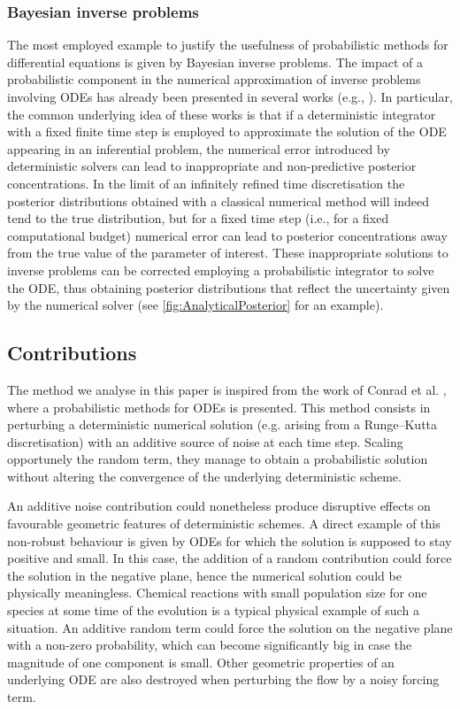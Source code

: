 \documentclass[10pt]{article}
\begin{document}
\subsubsection*{Bayesian inverse problems} The most employed example to justify the usefulness of probabilistic methods for differential equations is given by Bayesian inverse problems. The impact of a probabilistic component in the numerical approximation of inverse problems involving ODEs has already been presented in several works (e.g., \cite{CGS16, CCC16, COS17}). In particular, the common underlying idea of these works is that if a deterministic integrator with a fixed finite time step is employed to approximate the solution of the ODE appearing in an inferential problem, the numerical error introduced by deterministic solvers can lead to inappropriate and non-predictive posterior concentrations. In the limit of an infinitely refined time discretisation the posterior distributions obtained with a classical numerical method will indeed tend to the true distribution, but for a fixed time step (i.e., for a fixed computational budget) numerical error can lead to posterior concentrations away from the true value of the parameter of interest. These inappropriate solutions to inverse problems can be corrected employing a probabilistic integrator to solve the ODE, thus obtaining posterior distributions that reflect the uncertainty given by the numerical solver (see \cref{fig:AnalyticalPosterior} for an example).


\subsection{Contributions} The method we analyse in this paper is inspired from the work of Conrad et al. \cite{CGS16}, where a probabilistic methods for ODEs is presented. This method consists in perturbing a deterministic numerical solution (e.g. arising from a Runge--Kutta discretisation) with an additive source of noise at each time step. Scaling opportunely the random term, they manage to obtain a probabilistic solution without altering the convergence of the underlying deterministic scheme. 

An additive noise contribution could nonetheless produce disruptive effects on favourable geometric features of deterministic schemes. A direct example of this non-robust behaviour is given by ODEs for which the solution is supposed to stay positive and small. In this case, the addition of a random contribution could force the solution in the negative plane, hence the numerical solution could be physically meaningless. Chemical reactions with small population size for one species at some time of the evolution is a typical physical example of such a situation. An additive random term could force the solution on the negative plane with a non-zero probability, which can become significantly big in case the magnitude of one component is small. Other geometric properties of an underlying ODE are also destroyed when perturbing the flow by a noisy forcing term.
\end{document}
